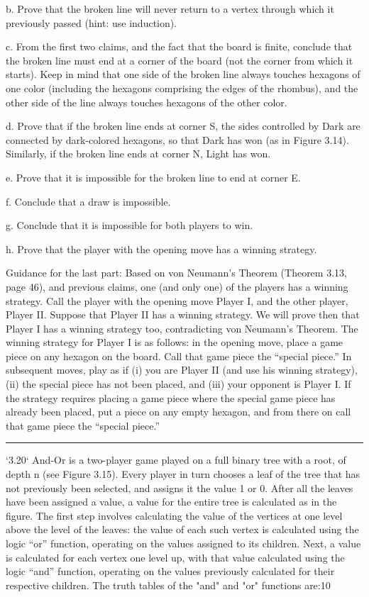 \documentclass[10pt]{report}
\begin{document}
		b. Prove that the broken line will never return to a vertex through which it previously passed (hint: use induction).

		c. From the first two claims, and the fact that the board is finite, conclude that the broken line must end at a corner of the board (not the corner from which it starts). Keep in mind that one side of the broken line always touches hexagons of one color (including the hexagons comprising the edges of the rhombus), and the other side of the line always touches hexagons of the other color.

		d. Prove that if the broken line ends at corner S, the sides controlled by Dark are connected by dark-colored hexagons, so that Dark has won (as in Figure 3.14). Similarly, if the broken line ends at corner N, Light has won.

		e. Prove that it is impossible for the broken line to end at corner E.

		f. Conclude that a draw is impossible.

		g. Conclude that it is impossible for both players to win.

		h. Prove that the player with the opening move has a winning strategy.

		Guidance for the last part: Based on von Neumann’s Theorem (Theorem 3.13, page 46), and previous claims, one (and only one) of the players has a winning strategy. Call the player with the opening move Player I, and the other player, Player II. Suppose that Player II has a winning strategy. We will prove then that Player I has a winning strategy too, contradicting von Neumann’s Theorem. The winning strategy for Player I is as follows: in the opening move, place a game piece on any hexagon on the board. Call that game piece the “special piece.” In subsequent moves, play as if (i) you are Player II (and use his winning strategy), (ii) the special piece has not been placed, and (iii) your opponent is Player I. If the strategy requires placing a game piece where the special game piece has already been placed, put a piece on any empty hexagon, and from there on call that game piece the “special piece.”

		\vspace{0.5cm}
		\hrule
		\vspace{0.5cm}
		`3.20` And-Or is a two-player game played on a full binary tree with a root, of depth n (see Figure 3.15). Every player in turn chooses a leaf of the tree that has not previously been selected, and assigns it the value 1 or 0. After all the leaves have been assigned a value, a value for the entire tree is calculated as in the figure. The first step involves calculating the value of the vertices at one level above the level of the leaves: the value of each such vertex is calculated using the logic “or” function, operating on the values assigned to its children. Next, a value is calculated for each vertex one level up, with that value calculated using the logic “and” function, operating on the values previously calculated for their respective children. The truth tables of the "and" and "or" functions are:10
\end{document}
